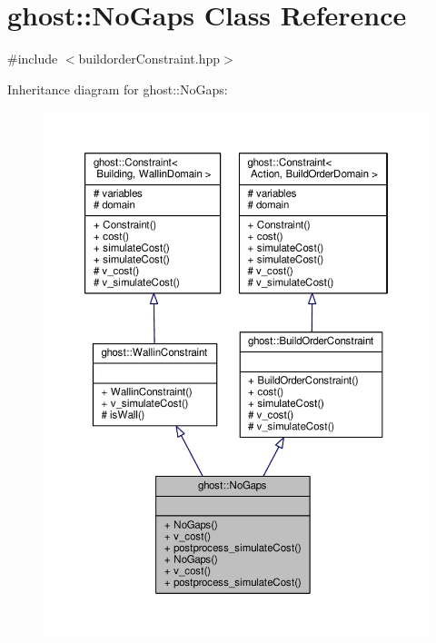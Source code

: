 \hypertarget{classghost_1_1NoGaps}{\section{ghost\-:\-:No\-Gaps Class Reference}
\label{classghost_1_1NoGaps}
}


{\ttfamily \#include $<$buildorder\-Constraint.\-hpp$>$}



Inheritance diagram for ghost\-:\-:No\-Gaps\-:
\nopagebreak
\begin{figure}[H]
\begin{center}
\leavevmode
\includegraphics[width=350pt]{classghost_1_1NoGaps__inherit__graph}
\end{center}
\end{figure}



